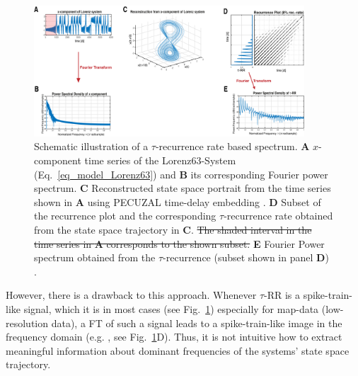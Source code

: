 \documentclass[entropy,article,submit,pdftex,moreauthors]{Definitions/mdpi}
\begin{document}
\begin{figure}
 \centering
 \includegraphics[width=0.9\textwidth]{./figures/fig_tau_rr_spectrum_example}
 \caption{Schematic illustration of a $\tau$-recurrence rate based spectrum. \textbf{A} $x$-component time series of the Lorenz63-System (Eq.~\eqref{eq_model_Lorenz63}) and 
 \textbf{B} its corresponding Fourier power spectrum. 
 \textbf{C} Reconstructed state space portrait from the time series shown in \textbf{A} using PECUZAL time-delay embedding \cite{Kraemer2021}. 
 \textbf{D} Subset of the recurrence plot and the corresponding $\tau$-recurrence rate obtained from the state space trajectory in \textbf{C}. \sout{The shaded interval in the time series in \textbf{A} corresponds to the shown subset.} 
 \textbf{E} Fourier Power spectrum obtained from the $\tau$-recurrence (subset shown in panel \textbf{D}) \cite{Zbilut2008}. 
 }\label{fig_tau_rr_spectrum_example}
\end{figure}

However, there is a drawback to this approach. Whenever $\tau$-RR is a spike-train-like signal, which it is in most cases (see Fig.~\ref{fig_tau_rr_spectrum_example}) especially for 
map-data (low-resolution data), a FT of such a signal leads to a spike-train-like image in the frequency domain (e.g. \cite{Schild1982,Cordoba1989}, see 
Fig.~\ref{fig_tau_rr_spectrum_example}D). Thus, it is not intuitive how to extract meaningful information about dominant frequencies of the systems' state space trajectory. 
\end{document}
